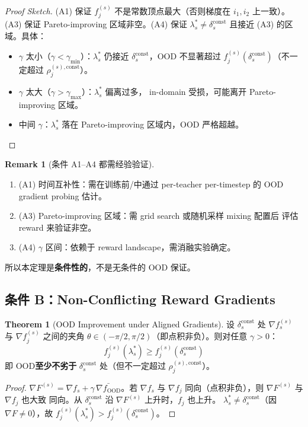 \documentclass[11pt,a4paper]{article}
\newcommand{\OOD}{\mathrm{OOD}}
\newcommand{\const}{\mathrm{const}}
\theoremstyle{definition}
\newtheorem{remark}{Remark}
\newtheorem{theorem}{Theorem}
\begin{document}
\begin{proof}[Proof Sketch]
(A1) 保证 $f_j^{(s)}$ 不是常数顶点最大（否则梯度在 $i_1, i_2$ 上一致）。
(A3) 保证 Pareto-improving 区域非空。(A4) 保证 $\lambda_s^* \neq \delta_s^\const$
且接近 (A3) 的区域。具体：
\begin{itemize}[leftmargin=1.5em]
\item $\gamma$ 太小（$\gamma < \gamma_{\min}$）：$\lambda_s^*$ 仍接近
$\delta_s^\const$，OOD 不显著超过 $f_j^{(s)}(\delta_s^\const)$（不一定超过
$\rho_j^{(s),\const}$）。
\item $\gamma$ 太大（$\gamma > \gamma_{\max}$）：$\lambda_s^*$ 偏离过多，
in-domain 受损，可能离开 Pareto-improving 区域。
\item 中间 $\gamma$：$\lambda_s^*$ 落在 Pareto-improving 区域内，OOD 严格超越。
\end{itemize}
\end{proof}

\begin{remark}[条件 A1--A4 都需经验验证]
\begin{enumerate}[leftmargin=1.5em]
\item (A1) 时间互补性：需在训练前/中通过 per-teacher per-timestep 的 OOD
gradient probing 估计。
\item (A3) Pareto-improving 区域：需 grid search 或随机采样 mixing 配置后
评估 reward 来验证非空。
\item (A4) $\gamma$ 区间：依赖于 reward landscape，需消融实验确定。
\end{enumerate}
所以本定理是\textbf{条件性的}，不是无条件的 OOD 保证。
\end{remark}

\subsection{条件 B：Non-Conflicting Reward Gradients}

\begin{theorem}[OOD Improvement under Aligned Gradients]
\label{thm:aligned}
设 $\delta_s^\const$ 处 $\nabla f_s^{(s)}$ 与 $\nabla f_j^{(s)}$ 之间的夹角
$\theta \in (-\pi/2, \pi/2)$（即点积非负）。则对任意 $\gamma > 0$：
\begin{equation}
f_j^{(s)}(\lambda_s^*) \geq f_j^{(s)}(\delta_s^\const)
\end{equation}
即 OOD\textbf{至少不劣于} $\delta_s^\const$ 处（但不一定超过 $\rho_j^{(s),\const}$）。
\end{theorem}

\begin{proof}
$\nabla F^{(s)} = \nabla f_s + \gamma\,\bar{\nabla f_{\OOD}}$。若 $\nabla f_s$
与 $\nabla f_j$ 同向（点积非负），则 $\nabla F^{(s)}$ 与 $\nabla f_j$ 也大致
同向。从 $\delta_s^\const$ 沿 $\nabla F^{(s)}$ 上升时，$f_j$ 也上升。
$\lambda_s^* \neq \delta_s^\const$（因 $\nabla F \neq 0$），故 $f_j^{(s)}(\lambda_s^*) > f_j^{(s)}(\delta_s^\const)$。
\end{proof}
\end{document}
